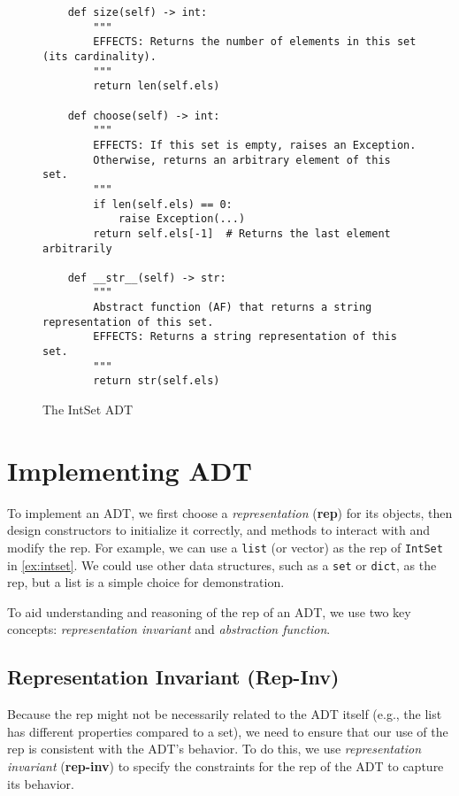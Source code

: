 \documentclass[oneside,11pt,dvipsnames]{book}
\newcommand{\code}[1]{\texttt{#1}}
\begin{document}
\begin{figure}
\begin{lstlisting}
    def size(self) -> int:
        """
        EFFECTS: Returns the number of elements in this set (its cardinality).
        """
        return len(self.els)

    def choose(self) -> int:
        """
        EFFECTS: If this set is empty, raises an Exception. 
        Otherwise, returns an arbitrary element of this set.
        """
        if len(self.els) == 0:
            raise Exception(...)
        return self.els[-1]  # Returns the last element arbitrarily

    def __str__(self) -> str:
        """
        Abstract function (AF) that returns a string representation of this set.
        EFFECTS: Returns a string representation of this set.
        """
        return str(self.els)
\end{lstlisting}
\caption{The IntSet ADT}\label{ex:intset}
\end{figure}


\section{Implementing ADT}\label{sec:implementing-adt}

To implement an ADT, we first choose a \emph{representation} (\textbf{rep}) for its objects, then design constructors to initialize it correctly, and methods to interact with and modify the rep. 
For example, we can use a \code{list} (or vector) as the rep of \code{IntSet} in \autoref{ex:intset}. We could use other data structures, such as a \code{set} or \code{dict}, as the rep, but a list is a simple choice for demonstration.


To aid understanding and reasoning of the rep of an ADT, we use two key concepts: \emph{representation invariant} and \emph{abstraction function}.

\subsection{Representation Invariant (Rep-Inv)} Because the rep might not be necessarily related to the ADT itself (e.g., the list has different properties compared to a set), we need to ensure that our use of the rep is consistent with the ADT's behavior. 
To do this, we use \emph{representation invariant} (\textbf{rep-inv}) to specify the constraints for the rep of the ADT to capture its behavior. 
\end{document}

